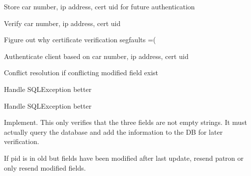 
\begin{DoxyRefList}
\item[\label{todo__todo000002}%
\hypertarget{todo__todo000002}{}%
Member \hyperlink{classGTBCommunication_aed33aec9911e0d570d4653cabd776d6b}{G\-T\-B\-Communication\-:\-:auth\-Request} (\hyperlink{classRequest}{Request} $\ast$i\-\_\-a\-P\-B\-Req)]Store car number, ip address, cert uid for future authentication  
\item[\label{todo__todo000003}%
\hypertarget{todo__todo000003}{}%
Member \hyperlink{classGTBCommunication_ae20ca3b3751720d3ef10bbdfbd4cd25a}{G\-T\-B\-Communication\-:\-:curr\-Request} (\hyperlink{classRequest}{Request} $\ast$i\-\_\-a\-P\-B\-Req, \hyperlink{classResponse}{Response} $\ast$i\-\_\-apb\-Res)]Verify car number, ip address, cert uid  
\item[\label{todo__todo000001}%
\hypertarget{todo__todo000001}{}%
Member \hyperlink{classGTBCommunication_a6353b9cc417d4f7a3fd309fc911cf8f1}{G\-T\-B\-Communication\-:\-:handle\-Connection} (int fd\-Accepted, int sockfd)]Figure out why certificate verification segfaults =( 
\item[\label{todo__todo000004}%
\hypertarget{todo__todo000004}{}%
Member \hyperlink{classGTBCommunication_afd6c49f0bd73a7c2014673b58c87c68b}{G\-T\-B\-Communication\-:\-:updt\-Request} (\hyperlink{classRequest}{Request} $\ast$i\-\_\-a\-P\-B\-Req, \hyperlink{classResponse}{Response} $\ast$i\-\_\-apb\-Res)]Authenticate client based on car number, ip address, cert uid 

Conflict resolution if conflicting modified field exist  
\item[\label{todo__todo000010}%
\hypertarget{todo__todo000010}{}%
Member \hyperlink{classMySQLConn_a045c9cb16434df8c1e50dd7ef6766c5f}{My\-S\-Q\-L\-Conn\-:\-:add\-Location} (std\-::string loc)]Handle S\-Q\-L\-Exception better  
\item[\label{todo__todo000009}%
\hypertarget{todo__todo000009}{}%
Member \hyperlink{classMySQLConn_a017c08a9bfdf5c20509f754af7c8c7f7}{My\-S\-Q\-L\-Conn\-:\-:add\-Patron} (int carnum, \hyperlink{classRequest}{Request} $\ast$i\-\_\-a\-P\-B\-Req)]Handle S\-Q\-L\-Exception better  
\item[\label{todo__todo000006}%
\hypertarget{todo__todo000006}{}%
Member \hyperlink{classMySQLConn_ae96f09e4aa859a5294c90ec498c38928}{My\-S\-Q\-L\-Conn\-:\-:check\-Auth} (std\-::string i\-\_\-snetid, std\-::string i\-\_\-sauth, std\-::string i\-\_\-scarnum)]Implement. This only verifies that the three fields are not empty strings. It must actually query the database and add the information to the D\-B for later verification.  
\item[\label{todo__todo000007}%
\hypertarget{todo__todo000007}{}%
Member \hyperlink{classMySQLConn_a259785bc51cae6d0c6c950f6bdf6f475}{My\-S\-Q\-L\-Conn\-:\-:get\-Curr} (int carnum, \hyperlink{classPatronList}{Patron\-List} $\ast$i\-\_\-apb\-Patl, std\-::vector$<$ int $>$)]If pid is in old but fields have been modified after last update, resend patron or only resend modified fields. 


\end{DoxyRefList}
